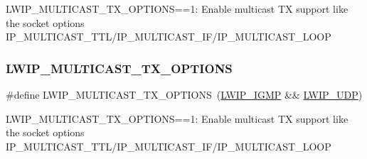 L\+W\+I\+P\+\_\+\+M\+U\+L\+T\+I\+C\+A\+S\+T\+\_\+\+T\+X\+\_\+\+O\+P\+T\+I\+O\+NS==1\+: Enable multicast TX support like the socket options I\+P\+\_\+\+M\+U\+L\+T\+I\+C\+A\+S\+T\+\_\+\+T\+T\+L/\+I\+P\+\_\+\+M\+U\+L\+T\+I\+C\+A\+S\+T\+\_\+\+I\+F/\+I\+P\+\_\+\+M\+U\+L\+T\+I\+C\+A\+S\+T\+\_\+\+L\+O\+OP \mbox{\label{group__lwip__opts__igmp_gab8d7d53247cc62caa76f54b2c5a5df30}} 
\subsubsection{\texorpdfstring{L\+W\+I\+P\+\_\+\+M\+U\+L\+T\+I\+C\+A\+S\+T\+\_\+\+T\+X\+\_\+\+O\+P\+T\+I\+O\+NS}{LWIP\_MULTICAST\_TX\_OPTIONS}\hspace{0.1cm}{\footnotesize\ttfamily [2/2]}}
{\footnotesize\ttfamily \#define L\+W\+I\+P\+\_\+\+M\+U\+L\+T\+I\+C\+A\+S\+T\+\_\+\+T\+X\+\_\+\+O\+P\+T\+I\+O\+NS~(\hyperlink{openmote-cc2538_2lwip_2test_2unit_2lwipopts_8h_adaf25915ae1fd69c0943ef68cbb38923}{L\+W\+I\+P\+\_\+\+I\+G\+MP} \&\& \hyperlink{group__lwip__opts__udp_gab6030e96e72df649d2650fd32d7a67b3}{L\+W\+I\+P\+\_\+\+U\+DP})}

L\+W\+I\+P\+\_\+\+M\+U\+L\+T\+I\+C\+A\+S\+T\+\_\+\+T\+X\+\_\+\+O\+P\+T\+I\+O\+NS==1\+: Enable multicast TX support like the socket options I\+P\+\_\+\+M\+U\+L\+T\+I\+C\+A\+S\+T\+\_\+\+T\+T\+L/\+I\+P\+\_\+\+M\+U\+L\+T\+I\+C\+A\+S\+T\+\_\+\+I\+F/\+I\+P\+\_\+\+M\+U\+L\+T\+I\+C\+A\+S\+T\+\_\+\+L\+O\+OP 